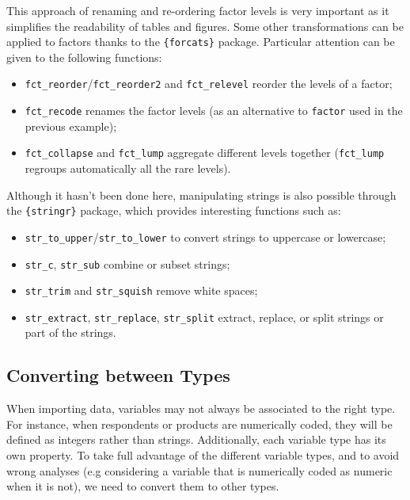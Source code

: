\documentclass[
]{book}
\providecommand{\tightlist}{%
  \setlength{\itemsep}{0pt}\setlength{\parskip}{0pt}}
\begin{document}
This approach of renaming and re-ordering factor levels is very important as it simplifies the readability of tables and figures.
Some other transformations can be applied to factors thanks to the \texttt{\{forcats\}} package. Particular attention can be given to the following functions:

\begin{itemize}
\tightlist
\item
  \texttt{fct\_reorder}/\texttt{fct\_reorder2} and \texttt{fct\_relevel} reorder the levels of a factor;
\item
  \texttt{fct\_recode} renames the factor levels (as an alternative to \texttt{factor} used in the previous example);
\item
  \texttt{fct\_collapse} and \texttt{fct\_lump} aggregate different levels together (\texttt{fct\_lump} regroups automatically all the rare levels).
\end{itemize}

Although it hasn't been done here, manipulating strings is also possible through the \texttt{\{stringr\}} package, which provides interesting functions such as:

\begin{itemize}
\tightlist
\item
  \texttt{str\_to\_upper}/\texttt{str\_to\_lower} to convert strings to uppercase or lowercase;
\item
  \texttt{str\_c}, \texttt{str\_sub} combine or subset strings;
\item
  \texttt{str\_trim} and \texttt{str\_squish} remove white spaces;
\item
  \texttt{str\_extract}, \texttt{str\_replace}, \texttt{str\_split} extract, replace, or split strings or part of the strings.
\end{itemize}

\hypertarget{converting-between-types}{%
\subsection{Converting between Types}\label{converting-between-types}}

When importing data, variables may not always be associated to the right type. For instance, when respondents or products are numerically coded, they will be defined as integers rather than strings. Additionally, each variable type has its own property. To take full advantage of the different variable types, and to avoid wrong analyses (e.g considering a variable that is numerically coded as numeric when it is not), we need to convert them to other types.
\end{document}
